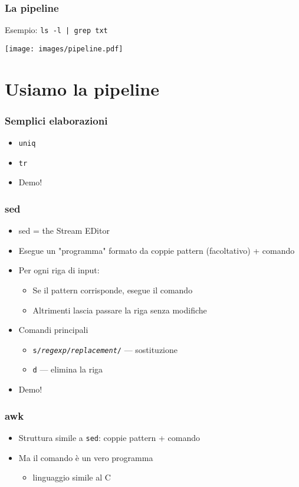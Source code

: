 \documentclass[xetex,table]{beamer}
\begin{document}
\begin{frame}
  \frametitle{La pipeline}
  Esempio: \texttt{ls -l | grep txt}
  \begin{center}
    \texttt{[image: images/pipeline.pdf]}
  \end{center}
\end{frame}

\section{Usiamo la pipeline}

\begin{frame}
  \frametitle{Semplici elaborazioni}
  \begin{itemize}
  \item \texttt{uniq}
  \item \texttt{tr}
  \item Demo!
  \end{itemize}
\end{frame}

\begin{frame}
  \frametitle{sed}
  \begin{itemize}
  \item sed = the Stream EDitor
  \item Esegue un "programma" formato da coppie pattern (facoltativo)
    + comando
  \item Per ogni riga di input:
    \begin{itemize}
    \item Se il pattern corrisponde, esegue il comando
    \item Altrimenti lascia passare la riga senza modifiche
    \end{itemize}
  \item Comandi principali
    \begin{itemize}
    \item \texttt{s/\emph{regexp}/\emph{replacement}/} --- sostituzione
    \item \texttt{d} --- elimina la riga
    \end{itemize}
  \item Demo!
  \end{itemize}
\end{frame}

\begin{frame}
  \frametitle{awk}
  \begin{itemize}
  \item Struttura simile a \texttt{sed}: coppie pattern + comando
  \item Ma il comando è un vero programma
    \begin{itemize}
    \item linguaggio simile al C
    \end{itemize}
  \end{itemize}
\end{frame}
\end{document}
